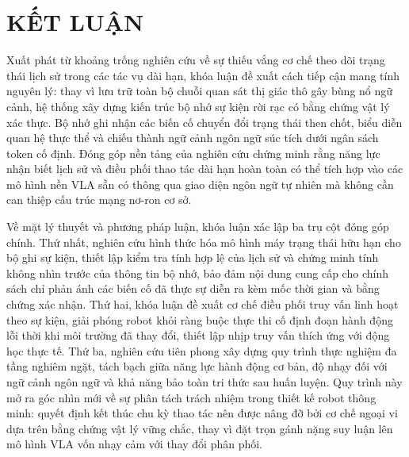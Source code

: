\chapter{KẾT LUẬN}

Xuất phát từ khoảng trống nghiên cứu về sự thiếu vắng cơ chế theo dõi trạng thái lịch sử trong các tác vụ dài hạn, khóa luận đề xuất cách tiếp cận mang tính nguyên lý: thay vì lưu trữ toàn bộ chuỗi quan sát thị giác thô gây bùng nổ ngữ cảnh, hệ thống xây dựng kiến trúc bộ nhớ sự kiện rời rạc có bằng chứng vật lý xác thực. Bộ nhớ ghi nhận các biến cố chuyển đổi trạng thái then chốt, biểu diễn quan hệ thực thể và chiếu thành ngữ cảnh ngôn ngữ súc tích dưới ngân sách token cố định. Đóng góp nền tảng của nghiên cứu chứng minh rằng năng lực nhận biết lịch sử và điều phối thao tác dài hạn hoàn toàn có thể tích hợp vào các mô hình nền VLA sẵn có thông qua giao diện ngôn ngữ tự nhiên mà không cần can thiệp cấu trúc mạng nơ-ron cơ sở.

Về mặt lý thuyết và phương pháp luận, khóa luận xác lập ba trụ cột đóng góp chính. Thứ nhất, nghiên cứu hình thức hóa mô hình máy trạng thái hữu hạn cho bộ ghi sự kiện, thiết lập kiểm tra tính hợp lệ của lịch sử và chứng minh tính không nhìn trước của thông tin bộ nhớ, bảo đảm nội dung cung cấp cho chính sách chỉ phản ánh các biến cố đã thực sự diễn ra kèm mốc thời gian và bằng chứng xác nhận. Thứ hai, khóa luận đề xuất cơ chế điều phối truy vấn linh hoạt theo sự kiện, giải phóng robot khỏi ràng buộc thực thi cố định đoạn hành động lỗi thời khi môi trường đã thay đổi, thiết lập nhịp truy vấn thích ứng với động học thực tế. Thứ ba, nghiên cứu tiên phong xây dựng quy trình thực nghiệm đa tầng nghiêm ngặt, tách bạch giữa năng lực hành động cơ bản, độ nhạy đối với ngữ cảnh ngôn ngữ và khả năng bảo toàn tri thức sau huấn luyện. Quy trình này mở ra góc nhìn mới về sự phân tách trách nhiệm trong thiết kế robot thông minh: quyết định kết thúc chu kỳ thao tác nên được nâng đỡ bởi cơ chế ngoại vi dựa trên bằng chứng vật lý vững chắc, thay vì đặt trọn gánh nặng suy luận lên mô hình VLA vốn nhạy cảm với thay đổi phân phối.

